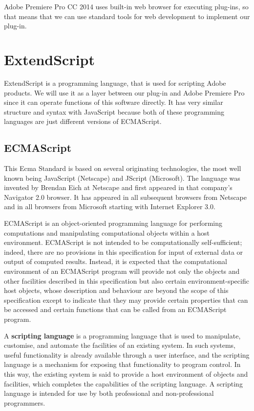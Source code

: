 \documentclass[thesis=B,english]{FITthesis}[2012/10/20]
\begin{document}
Adobe Premiere Pro CC 2014 uses built-in web browser for executing plug-ins, so that means that we can use standard tools for web development to implement our plug-in.

\section{ExtendScript}
ExtendScript is a programming language, that is used for scripting Adobe products. We will use it as a layer between our plug-in and Adobe Premiere Pro since it can operate functions of this software directly. It has very similar structure and syntax with JavaScript because both of these programming languages are just different versions of ECMAScript.
\subsection{ECMAScript}
This Ecma Standard is based on several originating technologies, the most well known being JavaScript (Netscape) and JScript (Microsoft). The language was invented by Brendan Eich at Netscape and first appeared in that company’s Navigator 2.0 browser. It has appeared in all subsequent browsers from Netscape and in all browsers from Microsoft starting with Internet Explorer 3.0.

ECMAScript is an object-oriented programming language for performing computations and manipulating computational objects within a host environment. ECMAScript is not intended to be computationally self-sufficient; indeed, there are no provisions in this specification for input of external data or output of computed results. Instead, it is expected that the computational environment of an ECMAScript program will provide not only the objects and other facilities described in this specification but also certain environment-specific host objects, whose description and behaviour are beyond the scope of this specification except to indicate that they may provide certain properties that can be accessed and certain functions that can be called from an ECMAScript program.

A \textbf{scripting language} is a programming language that is used to manipulate, customise, and automate the facilities of an existing system. In such systems, useful functionality is already available through a user interface, and the scripting language is a mechanism for exposing that functionality to program control. In this way, the existing system is said to provide a host environment of objects and facilities, which completes the capabilities of the scripting language. A scripting language is intended for use by both professional and non-professional programmers.
\end{document}
